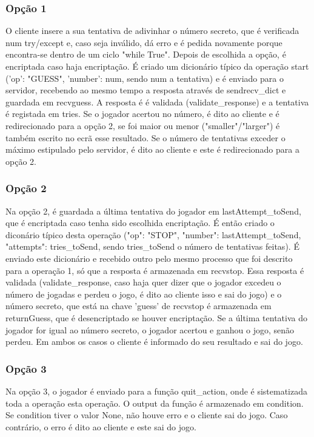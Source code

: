 \documentclass{report}
\begin{document}
\subsubsection{Opção 1}
\label{sssec:first}

O cliente insere a sua tentativa de adivinhar o número secreto, que é verificada num try/except e, caso seja inválido, dá
erro e é pedida novamente porque encontra-se dentro de um ciclo "while True". Depois de escolhida a opção, é encriptada
caso haja encriptação. É criado um dicionário típico da operação start ({'op': "GUESS", 'number': num}, sendo num a tentativa)
e é enviado para o servidor, recebendo ao mesmo tempo a resposta através de sendrecv\_dict e guardada em recvguess. A resposta é
é validada (validate\_response) e a tentativa é registada em tries. Se o jogador acertou no número, é dito ao cliente e é redirecionado
para a opção 2, se foi maior ou menor ("smaller"/"larger") é também escrito no ecrã esse resultado. Se o número de tentativas
exceder o máximo estipulado pelo servidor, é dito ao cliente e este é redirecionado para a opção 2.
\subsubsection{Opção 2}
\label{sssec:second}

Na opção 2, é guardada a última tentativa do jogador em lastAttempt\_toSend, que é encriptada caso tenha sido escolhida encriptação.
É então criado o diconário típico desta operação ({"op": "STOP", "number": lastAttempt\_toSend, "attempts": tries\_toSend}, sendo
tries\_toSend o número de tentativas feitas). É enviado este dicionário e recebido outro pelo mesmo processo que foi descrito para
a operação 1, só que a resposta é armazenada em recvstop. Essa resposta é validada (validate\_response, caso haja quer dizer que
o jogador excedeu o número de jogadas e perdeu o jogo, é dito ao cliente isso e sai do jogo)
e o número secreto, que está na chave 'guess' de recvstop é armazenada em returnGuess, que é desencriptado se houver encriptação.
Se a última tentativa do jogador for igual ao número secreto, o jogador acertou e ganhou o jogo, senão perdeu. Em ambos os casos
o cliente é informado do seu resultado e sai do jogo.
\subsubsection{Opção 3}
\label{sssec:third}
Na opção 3, o jogador é enviado para a função quit\_action, onde é sistematizada toda a operação esta operação. O output da função
é armazenado em condition. Se condition tiver o valor None, não houve erro e o cliente sai do jogo. Caso contrário, o erro é
dito ao cliente e este sai do jogo.
\end{document}

